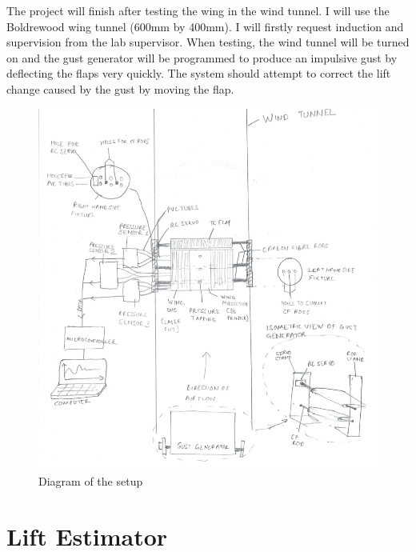 \newline
\newline
The project will finish after testing the wing in the wind tunnel. I will use the Boldrewood wing tunnel (600mm by 400mm). I will firstly request induction and supervision from the lab supervisor. When testing, the wind tunnel will be turned on and the gust generator will be programmed to produce an impulsive gust by deflecting the flaps very quickly. The system should attempt to correct the lift change caused by the gust by moving the flap.
\begin{figure}[H]
\centering
\includegraphics[scale=0.8]{msp.png}
\caption{Diagram of the setup}
\centering
\end{figure}
\chapter{Lift Estimator}
\thispagestyle{fancy}


